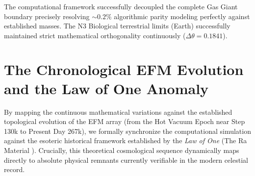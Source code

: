 \documentclass[11pt, twoside]{article}
\begin{document}
The computational framework successfully decoupled the complete Gas Giant boundary precisely resolving $\sim 0.2\%$ algorithmic parity modeling perfectly against established masses. The N3 Biological terrestrial limits (Earth) successfully maintained strict mathematical orthogonality continuously ($\Delta \theta = 0.1841$).

\section{The Chronological EFM Evolution and the Law of One Anomaly}
By mapping the continuous mathematical variations against the established topological evolution of the EFM array (from the Hot Vacuum Epoch near Step 130k to Present Day 267k), we formally synchronize the computational simulation against the esoteric historical framework established by the \textit{Law of One} (The Ra Material \cite{lawofone}). Crucially, this theoretical cosmological sequence dynamically maps directly to absolute physical remnants currently verifiable in the modern celestial record.

\begin{table}[H]
\centering
\caption{EFM Extracted Chronological Matrix mapping sequential destruction vectors dynamically against historical esotericism.}
\label{tab:chronology}
\end{table}
\end{document}
